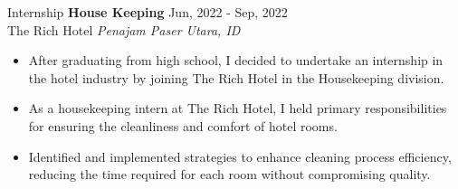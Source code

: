 \documentclass{resume} %
\begin{document}
\begin{rSection}{Internship} 
\textbf{House Keeping} \hfill Jun, 2022 - Sep, 2022\\
The Rich Hotel \hfill \textit{Penajam Paser Utara, ID}
 \begin{itemize}
    \itemsep -3pt {} 
     \item After graduating from high school, I decided to undertake an internship in the hotel industry by joining The Rich Hotel in the Housekeeping division.
     \item As a housekeeping intern at The Rich Hotel, I held primary responsibilities for ensuring the cleanliness and comfort of hotel rooms.
    \item Identified and implemented strategies to enhance cleaning process efficiency, reducing the time required for each room without compromising quality.
 \end{itemize}


\end{rSection}



\end{document}
